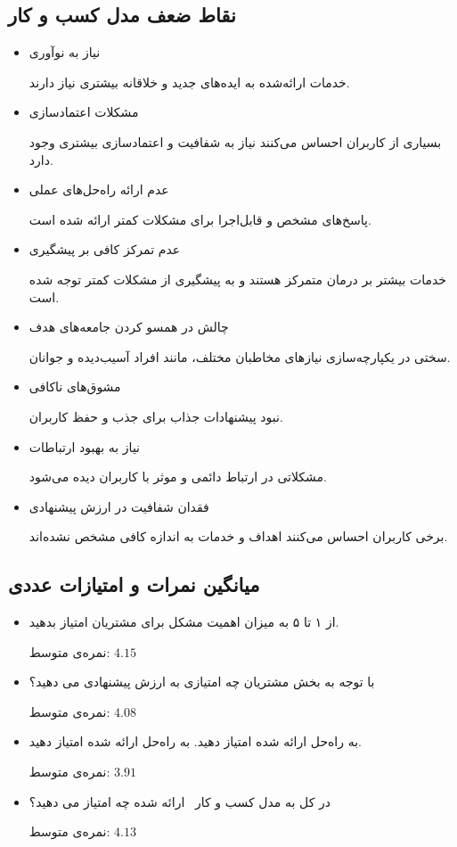 \documentclass[dvipsnames, svgnames, x11names, 11pt]{article}
\begin{document}
\subsection{نقاط ضعف مدل کسب و کار}
\begin{itemize}
\item 
نیاز به نوآوری

خدمات ارائه‌شده به ایده‌های جدید و خلاقانه بیشتری نیاز دارند.

\item 
مشکلات اعتمادسازی

بسیاری از کاربران احساس می‌کنند نیاز به شفافیت و اعتمادسازی بیشتری وجود دارد.

\item 
عدم ارائه راه‌حل‌های عملی

پاسخ‌های مشخص و قابل‌اجرا برای مشکلات کمتر ارائه شده است.

\item 
عدم تمرکز کافی بر پیشگیری

خدمات بیشتر بر درمان متمرکز هستند و به پیشگیری از مشکلات کمتر توجه شده است.

\item 
چالش در همسو کردن جامعه‌های هدف

سختی در یکپارچه‌سازی نیازهای مخاطبان مختلف، مانند افراد آسیب‌دیده و جوانان.

\item 
مشوق‌های ناکافی

نبود پیشنهادات جذاب برای جذب و حفظ کاربران.

\item 
نیاز به بهبود ارتباطات

مشکلاتی در ارتباط دائمی و موثر با کاربران دیده می‌شود.

\item 
فقدان شفافیت در ارزش پیشنهادی

برخی کاربران احساس می‌کنند اهداف و خدمات به اندازه کافی مشخص نشده‌اند.
\end{itemize}

\subsection{میانگین نمرات و امتیازات عددی}
\begin{itemize}
\item 
از ۱ تا ۵ به میزان اهمیت مشکل برای مشتریان امتیاز بدهید.

نمره‌ی متوسط: $4.15$

\item 
با توجه به بخش مشتریان چه امتیازی به ارزش پیشنهادی می دهید؟

نمره‌ی متوسط: $4.08$
\item 

به راه‌حل ارائه شده امتیاز دهید. به راه‌حل ارائه شده امتیاز دهید.

نمره‌ی متوسط: $3.91$
\item 
در کل به مدل کسب و کار  ارائه شده چه امتیاز می دهید؟

نمره‌ی متوسط: $4.13$

\end{itemize}
\end{document}
